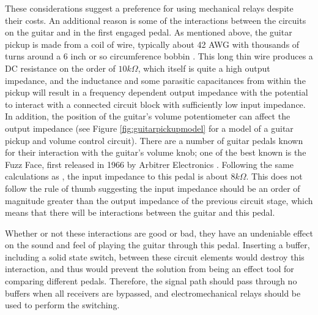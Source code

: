 \documentclass{article}
\begin{document}
		\color{black}

		These considerations suggest a preference for using mechanical relays despite their costs.  An additional reason is some of the interactions between the circuits on the guitar and in the first engaged pedal.  As mentioned above, the guitar pickup is made from a coil of wire, typically about 42 AWG with thousands of turns around a 6 inch or so circumference bobbin \cite{StewMacpickups}.  This long thin wire produces a DC resistance on the order of $10k\Omega$, which itself is quite a high output impedance, and the inductance and some parasitic capacitances from within the pickup will result in a frequency dependent output impedance with the potential to interact with a connected circuit block with sufficiently low input impedance.  In addition, the position of the guitar's volume potentiometer can affect the output impedance (see Figure \ref{fig:guitarpickupmodel} for a model of a guitar pickup and volume control circuit).  There are a number of guitar pedals known for their interaction with the guitar's volume knob; one of the best known is the Fuzz Face, first released in 1966 by Arbitrer Electronics \cite{FuzzFace}.  Following the same calculations as \cite{FuzzFace}, the input impedance to this pedal is about $8k\Omega$.  This does not follow the rule of thumb suggesting the input impedance should be an order of magnitude greater than the output impedance of the previous circuit stage, which means that there will be interactions between the guitar and this pedal.

		Whether or not these interactions are good or bad, they have an undeniable effect on the sound and feel of playing the guitar through this pedal.  Inserting a buffer, including a solid state switch, between these circuit elements would destroy this interaction, and thus would prevent the solution from being an effect tool for comparing different pedals.  Therefore, the signal path should pass through no buffers when all receivers are bypassed, and electromechanical relays should be used to perform the switching.
\end{document}
